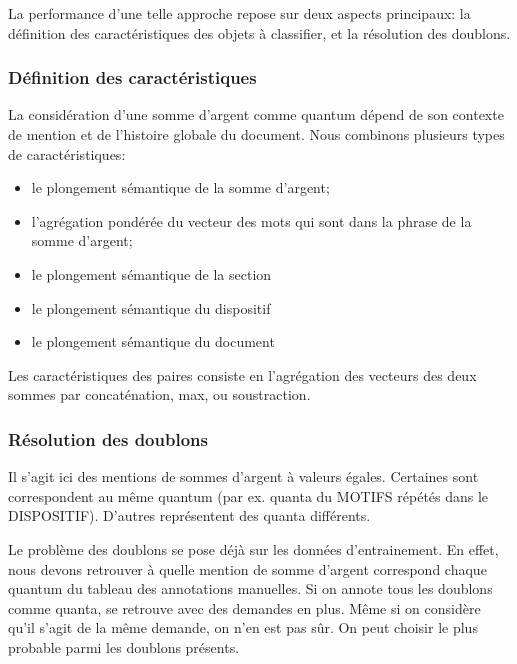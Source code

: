 La performance d'une telle approche repose sur deux aspects principaux: la définition des  caractéristiques des objets à classifier, et la résolution des doublons. 

\subsubsection{Définition des caractéristiques}

La considération d'une somme d'argent comme quantum dépend de son contexte de mention et de l'histoire globale du document. Nous combinons plusieurs types de caractéristiques:
\begin{itemize}
	\item le plongement sémantique de la somme d'argent;
	\item l'agrégation pondérée du vecteur des mots qui sont dans la phrase de la somme d'argent;
    \item le plongement sémantique de la section
    \item le plongement sémantique du dispositif
    \item le plongement sémantique du document
\end{itemize}

Les caractéristiques des paires consiste en l'agrégation des vecteurs des deux sommes par concaténation, max, ou soustraction.

\subsubsection{Résolution des doublons}
Il s'agit ici des mentions de sommes d'argent à valeurs égales. Certaines sont correspondent au même quantum (par ex. quanta du MOTIFS répétés dans le DISPOSITIF). D'autres représentent des quanta différents.

 Le problème des doublons se pose déjà sur les données d'entrainement. En effet, nous devons retrouver à quelle mention de somme d'argent correspond chaque quantum du tableau des annotations manuelles. Si on annote tous les doublons comme quanta, se retrouve avec des demandes en plus. Même si on considère qu'il s'agit de la même demande, on n'en est pas sûr. On peut choisir le plus probable parmi les doublons présents.


